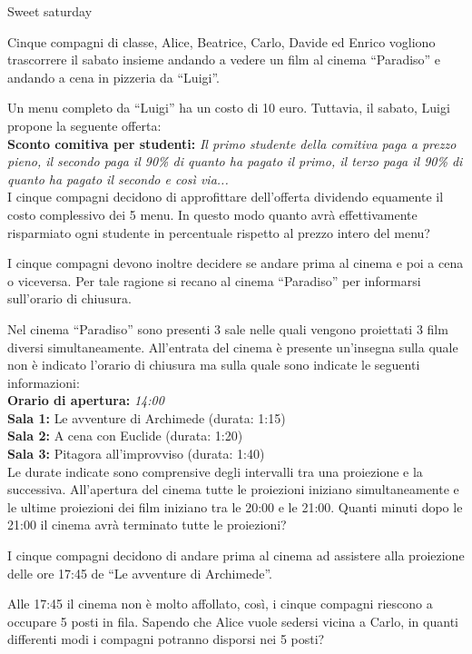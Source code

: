 \documentclass[12pt]{matemaj}
\begin{document}
\titolo Sweet saturday

Cinque compagni di classe, Alice, Beatrice, Carlo, Davide ed Enrico vogliono trascorrere il sabato insieme andando a vedere un film al cinema ``Paradiso'' e andando a cena in pizzeria da ``Luigi''.

\quesito[10;30]
Un menu completo da ``Luigi'' ha un costo di 10 euro. Tuttavia, il sabato, Luigi propone la seguente offerta:\\[6pt]
{\bf Sconto comitiva per studenti: }{\it Il primo studente della comitiva paga a prezzo pieno, il secondo paga il 90\% di quanto ha pagato il primo, il terzo paga il 90\% di quanto ha pagato il secondo e così via...}\\[6pt]
I cinque compagni decidono di approfittare dell'offerta dividendo equamente il costo complessivo dei 5 menu. In questo modo quanto avrà effettivamente risparmiato ogni studente in percentuale rispetto al prezzo intero del menu?

I cinque compagni devono inoltre decidere se andare prima al cinema e poi a cena o viceversa. Per tale ragione si recano al cinema ``Paradiso'' per informarsi sull'orario di chiusura.

\quesito[0;100]
Nel cinema ``Paradiso'' sono presenti 3 sale nelle quali vengono proiettati 3 film diversi simultaneamente. All'entrata del cinema è presente un'insegna sulla quale non è indicato l'orario di chiusura ma sulla quale sono indicate le seguenti informazioni:\\[6pt]
{\bf Orario di apertura: }{\it 14:00}\\[6pt]
{\bf Sala 1: }{Le avventure di Archimede (durata: 1:15)}\\[6pt]
{\bf Sala 2: }{A cena con Euclide (durata: 1:20)}\\[6pt]
{\bf Sala 3: }{Pitagora all'improvviso (durata: 1:40)}\\[6pt]
Le durate indicate sono comprensive degli intervalli tra una proiezione e la successiva. All'apertura del cinema tutte le proiezioni iniziano simultaneamente e le ultime proiezioni dei film iniziano tra le 20:00 e le 21:00. Quanti minuti dopo le 21:00 il cinema avrà terminato tutte le proiezioni?

I cinque compagni decidono di andare prima al cinema ad assistere alla proiezione delle ore 17:45 de ``Le avventure di Archimede''.

\quesito[1;60]
Alle 17:45 il cinema non è molto affollato, così, i cinque compagni riescono a occupare 5 posti in fila. Sapendo che Alice vuole sedersi vicina a Carlo, in quanti differenti modi i compagni potranno disporsi nei 5 posti?
\end{document}
